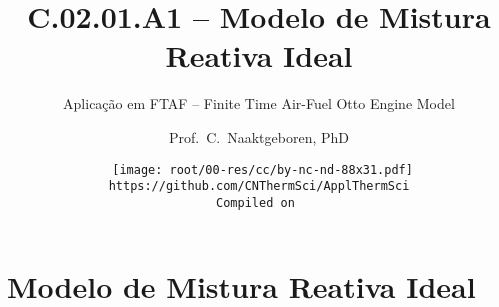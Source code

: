 \makeatletter
\immediate{} %
\makeatother



\title{C.02.01.A1 -- Modelo de Mistura Reativa Ideal}
\subtitle{Aplicação em FTAF -- Finite Time Air-Fuel Otto Engine Model}
\author{Prof.~C.~Naaktgeboren, PhD}
\date{{\scriptsize\tt%
    \texttt{[image: root/00-res/cc/by-nc-nd-88x31.pdf]}\\[\smallskipamount]
    https://github.com/CNThermSci/ApplThermSci\\
    Compiled on 
}}

\frame{\titlepage}

\section{Modelo de Mistura Reativa Ideal}

